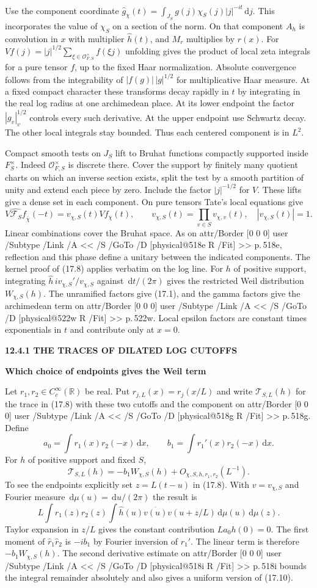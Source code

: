 \documentclass[11pt,letterpaper]{article}
\makeatletter
\newcommand{\rightmarktext}{}
\newcommand{\printfolio}{}
\newcommand{\leaf}[4]{\clearpage\gdef\printfolio{#1}\gdef\rightmarktext{#2}%
  {\small\sffamily\bfseries\color{ink}#3\par}\vspace{3pt}%
  {\LARGE\bfseries #4\par}\vspace{5pt}}
\newcommand{\R}{\mathbb R}
\newcommand{\dd}{\,\mathrm d}
\newcommand{\MusicPDFPageRef}[1]{\pdfpageref\csname physical@#1\endcsname\space\space 0 R}
\newcommand{\pagelink}[2]{\leavevmode\pdfstartlink attr{/Border [0 0 0]} user{%
  /Subtype /Link /A << /S /GoTo /D [\MusicPDFPageRef{#1} /Fit] >>}%
  {\color{ink}#2}\pdfendlink}
\newcommand{\pg}[1]{\pagelink{#1}{p.\,#1}}
\makeatother
\begin{document}
Use the component coordinate
$\widehat g_\chi(t)=\int_{J_S}g(j)\chi_S(j)|j|^{-it}\dd j$.
This incorporates the value of $\chi_S$ on a section of the norm.
On that component $A_h$ is convolution in $x$ with multiplier
$\widehat h(t)$, and $M_r$ multiplies by $r(x)$. For
$Vf(j)=|j|^{1/2}\sum_{\xi\in\mathcal O_{F,S}^\times}f(\xi j)$
unfolding gives the product of local zeta integrals for a pure tensor
$f$, up to the fixed Haar normalization. Absolute convergence follows
from the integrability of $|f(g)|\,|g|^{1/2}$ for multiplicative Haar
measure. At a fixed compact character these transforms decay rapidly
in $t$ by integrating in the real log radius at one archimedean place.
At its lower endpoint the factor $|g_v|_v^{1/2}$ controls every such
derivative. At the upper endpoint use Schwartz decay. The other local
integrals stay bounded. Thus each centered component is in $L^2$.

Compact smooth tests on $J_S$ lift to Bruhat functions compactly
supported inside $F_S^\times$. Indeed $\mathcal O_{F,S}^\times$ is
discrete there. Cover the support by finitely many quotient charts
on which an inverse section exists, split the test by a smooth
partition of unity and extend each piece by zero. Include the factor
$|j|^{-1/2}$ for $V$. These lifts give a dense set in each component.
On pure tensors Tate's local equations give
\[
  \widehat{V\mathcal F_S f}_{\bar\chi}(-t)
       =v_{\chi,S}(t)\widehat{V f}_\chi(t),\qquad
  v_{\chi,S}(t)=\prod_{v\in S}v_{\chi,v}(t),\quad |v_{\chi,S}(t)|=1.
\]
Linear combinations cover the Bruhat space. As on \pg{518e}, reflection
and this phase define a unitary between the indicated components.
The kernel proof of (17.8) applies verbatim on the log line.
For $h$ of positive support, integrating $\widehat h\,i v_{\chi,S}'/v_{\chi,S}$
against $\dd t/(2\pi)$ gives the restricted Weil distribution
$W_{\chi,S}(h)$. The unramified factors give (17.1), and the gamma
factors give the archimedean term on \pg{522w}. Local epsilon factors
are constant times exponentials in $t$ and contribute only at $x=0$.

\leaf{518h}{The two cutoff profiles}{12.4.1 \quad THE TRACES OF DILATED LOG CUTOFFS}{Which choice of endpoints gives the Weil term}
Let $r_1,r_2\in C_c^\infty(\R)$ be real. Put $r_{j,L}(x)=r_j(x/L)$
and write $\mathcal T_{S,L}(h)$ for the trace in (17.8) with these
two cutoffs and the component on \pg{518g}. Define
\[
 a_0=\int r_1(x)r_2(-x)\dd x,\qquad
 b_1=\int r_1'(x)r_2(-x)\dd x .
\]
For $h$ of positive support and fixed $S$,
\[
         \mathcal T_{S,L}(h)=-b_1 W_{\chi,S}(h)+O_{\chi,S,h,r_1,r_2}(L^{-1}).
 \tag{17.10}
\]
To see the endpoints explicitly set $z=L(t-u)$ in (17.8). With
$v=v_{\chi,S}$ and Fourier measure $\dd\mu(u)=\dd u/(2\pi)$ the result is
\[
 L\int \widehat r_1(z)\widehat r_2(z)\int
       \widehat h(u)\overline{v(u)}v(u+z/L)\dd\mu(u)\dd\mu(z).
\]
Taylor expansion in $z/L$ gives the constant contribution
$L a_0 h(0)=0$. The first moment of
$\widehat r_1\widehat r_2$ is $-i b_1$ by Fourier inversion of $r_1'$.
The linear term is therefore $-b_1 W_{\chi,S}(h)$.
The second derivative estimate on \pg{518i} bounds the integral
remainder absolutely and also gives a uniform version of (17.10).
\end{document}
